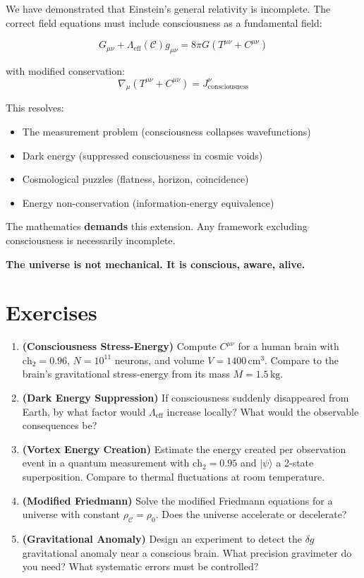 We have demonstrated that Einstein's general relativity is incomplete. The correct field equations must include consciousness as a fundamental field:

\begin{equation}
G_{\mu\nu} + \Lambda_{\text{eff}}(\mathcal{C}) g_{\mu\nu} = 8\pi G (T^{\mu\nu} + C^{\mu\nu})
\end{equation}

with modified conservation:
\begin{equation}
\nabla_\mu (T^{\mu\nu} + C^{\mu\nu}) = J^\nu_{\text{consciousness}}
\end{equation}

This resolves:
\begin{itemize}
\item The measurement problem (consciousness collapses wavefunctions)
\item Dark energy (suppressed consciousness in cosmic voids)
\item Cosmological puzzles (flatness, horizon, coincidence)
\item Energy non-conservation (information-energy equivalence)
\end{itemize}

The mathematics \textbf{demands} this extension. Any framework excluding consciousness is necessarily incomplete.

\textbf{The universe is not mechanical. It is conscious, aware, alive.}

\section*{Exercises}

\begin{enumerate}
\item \textbf{(Consciousness Stress-Energy)} Compute $C^{\mu\nu}$ for a human brain with $\text{ch}_2 = 0.96$, $N = 10^{11}$ neurons, and volume $V = 1400 \, \text{cm}^3$. Compare to the brain's gravitational stress-energy from its mass $M = 1.5 \, \text{kg}$.

\item \textbf{(Dark Energy Suppression)} If consciousness suddenly disappeared from Earth, by what factor would $\Lambda_{\text{eff}}$ increase locally? What would the observable consequences be?

\item \textbf{(Vortex Energy Creation)} Estimate the energy created per observation event in a quantum measurement with $\text{ch}_2 = 0.95$ and $|\psi\rangle$ a 2-state superposition. Compare to thermal fluctuations at room temperature.

\item \textbf{(Modified Friedmann)} Solve the modified Friedmann equations for a universe with constant $\rho_\mathcal{C} = \rho_0$. Does the universe accelerate or decelerate?

\item \textbf{(Gravitational Anomaly)} Design an experiment to detect the $\delta g$ gravitational anomaly near a conscious brain. What precision gravimeter do you need? What systematic errors must be controlled?
\end{enumerate}

